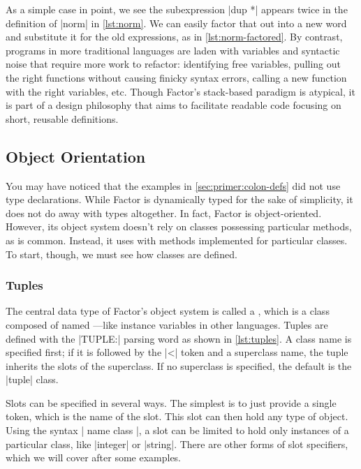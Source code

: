 
As a simple case in point, we see the subexpression \factor|dup *| appears
twice in the definition of \factor|norm| in \vref{lst:norm}.  We can easily
factor that out into a new word and substitute it for the old expressions, as
in \vref{lst:norm-factored}.  By contrast, programs in more traditional
languages are laden with variables and syntactic noise that require more work
to refactor: identifying free variables, pulling out the right functions
without causing finicky syntax errors, calling a new function with the right
variables, etc.  Though Factor's stack-based paradigm is atypical, it is part
of a design philosophy that aims to facilitate readable code focusing on short,
reusable definitions.

\subsection{Object Orientation}

You may have noticed that the examples in \cref{sec:primer:colon-defs} did not
use type declarations.  While Factor is dynamically typed for the sake of
simplicity, it does not do away with types altogether.  In fact, Factor is
object-oriented.  However, its object system doesn't rely on classes possessing
particular methods, as is common.  Instead, it uses  with
methods implemented for particular classes.  To start, though, we must see how
classes are defined.

\subsubsection{Tuples}


The central data type of Factor's object system is called a , which
is a class composed of named ---like instance variables in other
languages.  Tuples are defined with the \factor|TUPLE:| parsing word as shown
in \vref{lst:tuples}.  A class name is specified first; if it is followed by
the \factor|<| token and a superclass name, the tuple inherits the slots of the
superclass.  If no superclass is specified, the default is the \factor|tuple|
class.

Slots can be specified in several ways.  The simplest is to just provide a
single token, which is the name of the slot.  This slot can then hold any type
of object.  Using the syntax
%
\factor|{ name class }|,
%
a slot can be limited to hold only instances of a particular class, like
\factor|integer| or \factor|string|.  There are other forms of slot specifiers,
which we will cover after some examples.

